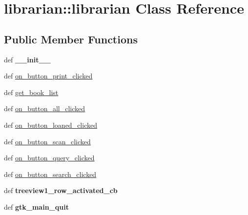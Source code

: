 \hypertarget{classlibrarian_1_1librarian}{
\section{librarian::librarian Class Reference}
\label{classlibrarian_1_1librarian}
}
\subsection*{Public Member Functions}
\begin{DoxyCompactItemize}
\item 
\hypertarget{classlibrarian_1_1librarian_a38767385296af734d843625e880b0f8c}{
def {\bfseries \_\-\_\-init\_\-\_\-}}
\label{classlibrarian_1_1librarian_a38767385296af734d843625e880b0f8c}

\item 
def \hyperlink{classlibrarian_1_1librarian_a8d9587a840f943752194b2c8b61f18a3}{on\_\-button\_\-print\_\-clicked}
\item 
def \hyperlink{classlibrarian_1_1librarian_af1b5a6a4ddf9b300601f1cdc6737ecd4}{get\_\-book\_\-list}
\item 
def \hyperlink{classlibrarian_1_1librarian_a7fb611e38bedeac2295e1ecb2b8aa2cc}{on\_\-button\_\-all\_\-clicked}
\item 
def \hyperlink{classlibrarian_1_1librarian_a7bb690bc8c84830399479b6f47eef8b0}{on\_\-button\_\-loaned\_\-clicked}
\item 
def \hyperlink{classlibrarian_1_1librarian_ad44a8c5d7a8ccb8d2c75e13eccb276b1}{on\_\-button\_\-scan\_\-clicked}
\item 
def \hyperlink{classlibrarian_1_1librarian_af71bf023c78a90863f2505562ad95d95}{on\_\-button\_\-query\_\-clicked}
\item 
def \hyperlink{classlibrarian_1_1librarian_ad83fd954fc9f028244d1ea3dbb96e0f9}{on\_\-button\_\-search\_\-clicked}
\item 
\hypertarget{classlibrarian_1_1librarian_af63e0d742fc6a1d82c9097c4c3c7f5c2}{
def {\bfseries treeview1\_\-row\_\-activated\_\-cb}}
\label{classlibrarian_1_1librarian_af63e0d742fc6a1d82c9097c4c3c7f5c2}

\item 
\hypertarget{classlibrarian_1_1librarian_aa904a6cfbe8a124965f9e2c148f64227}{
def {\bfseries gtk\_\-main\_\-quit}}
\label{classlibrarian_1_1librarian_aa904a6cfbe8a124965f9e2c148f64227}

\end{DoxyCompactItemize}
